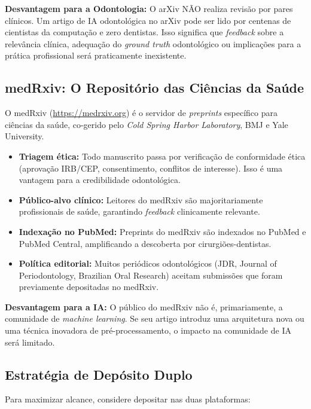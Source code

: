 \textbf{Desvantagem para a Odontologia:} O arXiv NÃO realiza revisão por pares
clínicos. Um artigo de IA odontológica no arXiv pode ser lido por centenas de
cientistas da computação e zero dentistas. Isso significa que \textit{feedback}
sobre a relevância clínica, adequação do \textit{ground truth} odontológico ou
implicações para a prática profissional será praticamente inexistente.

\subsection{medRxiv: O Repositório das Ciências da Saúde}

O medRxiv (\url{https://medrxiv.org}) é o servidor de \textit{preprints}
específico para ciências da saúde, co-gerido pelo \textit{Cold Spring Harbor
Laboratory}, BMJ e Yale University.

\begin{itemize}
  \item \textbf{Triagem ética:} Todo manuscrito passa por verificação de
    conformidade ética (aprovação IRB/CEP, consentimento, conflitos de
    interesse). Isso é uma vantagem para a credibilidade odontológica.
  \item \textbf{Público-alvo clínico:} Leitores do medRxiv são majoritariamente
    profissionais de saúde, garantindo \textit{feedback} clinicamente relevante.
  \item \textbf{Indexação no PubMed:} Preprints do medRxiv são indexados no
    PubMed e PubMed Central, amplificando a descoberta por cirurgiões-dentistas.
  \item \textbf{Política editorial:} Muitos periódicos odontológicos (JDR,
    Journal of Periodontology, Brazilian Oral Research) aceitam submissões que
    foram previamente depositadas no medRxiv.
\end{itemize}

\textbf{Desvantagem para a IA:} O público do medRxiv não é, primariamente, a
comunidade de \textit{machine learning}. Se seu artigo introduz uma arquitetura
nova ou uma técnica inovadora de pré-processamento, o impacto na comunidade de
IA será limitado.

\subsection{Estratégia de Depósito Duplo}

Para maximizar alcance, considere depositar nas duas plataformas:

